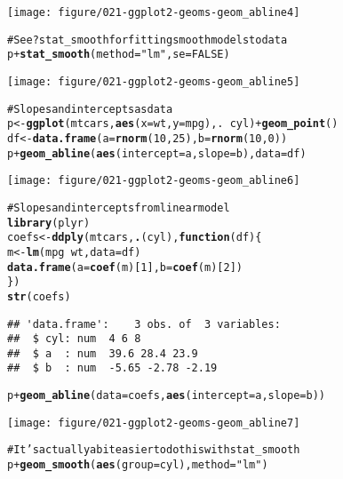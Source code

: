 \documentclass[a4paper,titlepage]{tufte-handout}\usepackage{graphicx, color}
\makeatletter
\def\maxwidth{ %
  \ifdim\Gin@nat@width>\linewidth
    \linewidth
  \else
    \Gin@nat@width
  \fi
}
\newcommand{\hlfunctioncall}[1]{\textcolor[rgb]{0.501960784313725,0,0.329411764705882}{\textbf{#1}}}%
\newcommand{\hlstring}[1]{\textcolor[rgb]{0.6,0.6,1}{#1}}%
\newcommand{\hlcomment}[1]{\textcolor[rgb]{0.180392156862745,0.6,0.341176470588235}{#1}}%
\newenvironment{kframe}{%
 \def\at@end@of@kframe{}%
 \ifinner\ifhmode%
  \def\at@end@of@kframe{\end{minipage}}%
  \begin{minipage}{\columnwidth}%
 \fi\fi%
 \def\FrameCommand##1{\hskip\@totalleftmargin \hskip-\fboxsep
 \colorbox{shadecolor}{##1}\hskip-\fboxsep
     \hskip-\linewidth \hskip-\@totalleftmargin \hskip\columnwidth}%
 \MakeFramed {\advance\hsize-\width
   \@totalleftmargin\z@ \linewidth\hsize
   \@setminipage}}%
 {\par\unskip\endMakeFramed%
 \at@end@of@kframe}
\newenvironment{knitrout}{}{} %
\makeatother
\begin{document}
\begin{knitrout}
\begin{kframe}
\begin{alltt}
\end{alltt}
\end{kframe}\texttt{[image: figure/021-ggplot2-geoms-geom\_abline4]} \begin{kframe}\begin{alltt}
\hlcomment{# See ?stat_smooth for fitting smooth models to data}
p + \hlfunctioncall{stat_smooth}(method=\hlstring{"lm"}, se=FALSE)
\end{alltt}
\end{kframe}\texttt{[image: figure/021-ggplot2-geoms-geom\_abline5]} \begin{kframe}\begin{alltt}
\hlcomment{# Slopes and intercepts as data}
p <- \hlfunctioncall{ggplot}(mtcars, \hlfunctioncall{aes}(x = wt, y=mpg), . ~ cyl) + \hlfunctioncall{geom_point}()
df <- \hlfunctioncall{data.frame}(a=\hlfunctioncall{rnorm}(10, 25), b=\hlfunctioncall{rnorm}(10, 0))
p + \hlfunctioncall{geom_abline}(\hlfunctioncall{aes}(intercept=a, slope=b), data=df)
\end{alltt}
\end{kframe}\texttt{[image: figure/021-ggplot2-geoms-geom\_abline6]} \begin{kframe}\begin{alltt}
\hlcomment{# Slopes and intercepts from linear model}
\hlfunctioncall{library}(plyr)
coefs <- \hlfunctioncall{ddply}(mtcars, \hlfunctioncall{.}(cyl), \hlfunctioncall{function}(df) \{
  m <- \hlfunctioncall{lm}(mpg ~ wt, data=df)
  \hlfunctioncall{data.frame}(a = \hlfunctioncall{coef}(m)[1], b = \hlfunctioncall{coef}(m)[2])
\})
\hlfunctioncall{str}(coefs)
\end{alltt}
\begin{verbatim}
## 'data.frame':	3 obs. of  3 variables:
##  $ cyl: num  4 6 8
##  $ a  : num  39.6 28.4 23.9
##  $ b  : num  -5.65 -2.78 -2.19
\end{verbatim}
\begin{alltt}
p + \hlfunctioncall{geom_abline}(data=coefs, \hlfunctioncall{aes}(intercept=a, slope=b))
\end{alltt}
\end{kframe}\texttt{[image: figure/021-ggplot2-geoms-geom\_abline7]} \begin{kframe}\begin{alltt}
\hlcomment{# It's actually a bit easier to do this with stat_smooth}
p + \hlfunctioncall{geom_smooth}(\hlfunctioncall{aes}(group=cyl), method=\hlstring{"lm"})
\end{alltt}

\end{kframe}
\end{knitrout}
\end{document}
